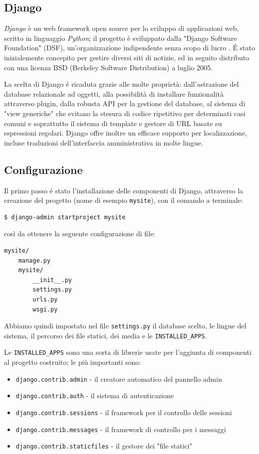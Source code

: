 \subsection{Django}
\label{subs:django}
\emph{Django} è un web framework open source per lo sviluppo di applicazioni web, scritto in linguaggio \emph{Python}; il progetto è sviluppato dalla "Django Software Foundation" (DSF), un'organizzazione indipendente senza scopo di lucro \cite{django}. É stato inizialemente concepito per gestire diversi siti di notizie, ed in seguito distributo con una licenza BSD (Berkeley Software Distribution) a luglio 2005.

La scelta di Django é ricaduta grazie alle molte proprietà: dall'astrazione del database relazionale ad oggetti, alla
possibilità di installare funzionalità attraverso plugin, dalla robusta API per la gestione del database, al sistema di "view generiche" che evitano la stesura di codice ripetitivo per determinati casi comuni e soprattutto il sistema di template  e gestore di URL basate su espressioni regolari. Django offre inoltre un efficace supporto per localizzazione, incluse traduzioni dell'interfaccia amministrativa in molte lingue.

\subsection{Configurazione}
\label{subs:config}
Il primo passo é stato l'installazione delle componenti di Django, attraverso la creazione del progetto (nome di esempio \texttt{mysite}), con il comando a terminale:
\begin{verbatim}
$ django-admin startproject mysite
\end{verbatim}

così da ottenere la seguente configurazione di file:
\begin{small}
\begin{verbatim}
mysite/
    manage.py
    mysite/
        __init__.py
        settings.py
        urls.py
        wsgi.py
\end{verbatim}
\end{small}

Abbiamo quindi impostato nel file \texttt{settings.py} il database scelto, le lingue del sistema, il percorso dei file statici, dei media e le \texttt{INSTALLED\_APPS}.

Le \texttt{INSTALLED\_APPS} sono una sorta di librerie usate per l'aggiunta di componenti al progetto costruito; le più importanti sono:
\begin{itemize}
 \item \texttt{django.contrib.admin} - il creatore automatico del pannello admin
 \item \texttt{django.contrib.auth} - il sistema di autenticazione
 \item \texttt{django.contrib.sessions} - il framework per il controllo delle sessioni
 \item \texttt{django.contrib.messages} - il framework di controllo per i messaggi
 \item \texttt{django.contrib.staticfiles} - il gestore dei "file statici"
\end{itemize}

